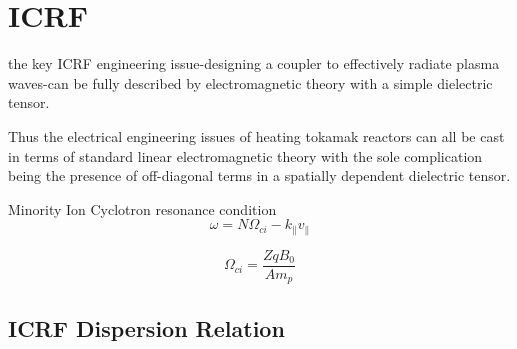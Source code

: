 % 
% 

\section{ICRF}\label{sec:icrh}




the key ICRF engineering issue-designing a coupler to effectively radiate plasma waves-can be fully described by electromagnetic theory with a simple dielectric tensor\cite{perkins1984}.

Thus the electrical engineering issues of heating tokamak
reactors can all be cast in terms of standard linear electromagnetic
theory with the sole complication being the presence
of off-diagonal terms in a spatially dependent dielectric tensor\cite{perkins1984}.

Minority Ion Cyclotron resonance condition
\begin{equation}
	\omega = N\Omega_{ci} - k_\parallel v_\parallel
\label{eq:ion_cylotron_resonance_general}
\end{equation}

\begin{equation}
\Omega_{ci} = \frac{Z q B_0}{A m_p}
\label{eq:ion_cyclotron_angular_frequency}
\end{equation}

\subsection{ICRF Dispersion Relation}

